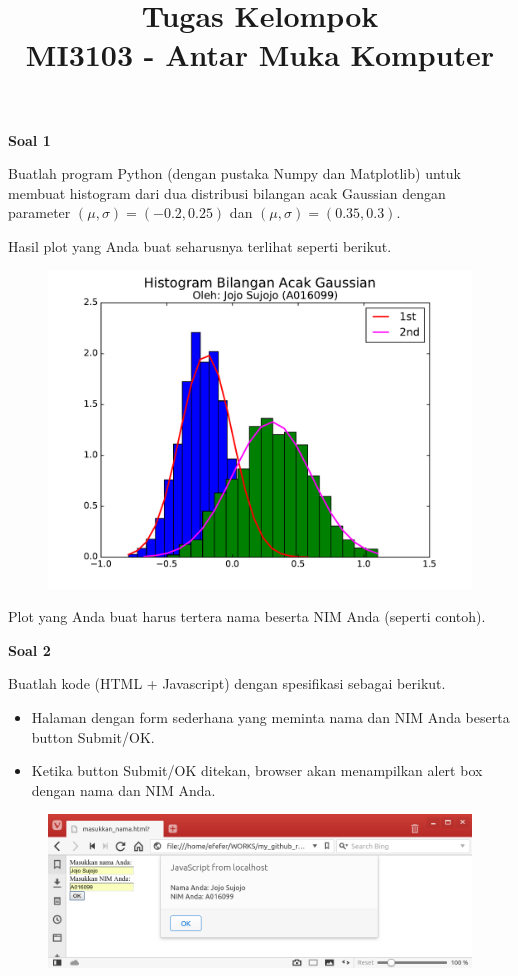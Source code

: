 \documentclass[a4paper,10pt]{extarticle}
\title{
Tugas Kelompok \\
MI3103 - Antar Muka Komputer}
\author{}
\date{}
\begin{document}
\maketitle

\textbf{Soal 1}

Buatlah program Python (dengan pustaka Numpy dan Matplotlib)
untuk membuat histogram dari dua distribusi bilangan
acak Gaussian dengan parameter $(\mu,\sigma) = (-0.2,0.25)$
dan $(\mu,\sigma) = (0.35,0.3)$.

Hasil plot yang Anda buat seharusnya terlihat seperti berikut.

\begin{figure}[h]
{\centering
\includegraphics[scale=0.5]{images/normal_v1.pdf}
\par}
\end{figure}
%
Plot yang Anda buat harus tertera nama beserta NIM Anda (seperti contoh).

\textbf{Soal 2}

Buatlah kode (HTML + Javascript) dengan spesifikasi sebagai berikut.
\begin{itemize}
\item Halaman dengan form sederhana yang meminta nama dan NIM Anda beserta
button Submit/OK.
\item Ketika button Submit/OK ditekan, browser akan menampilkan alert box
dengan nama dan NIM Anda.
\end{itemize}

\begin{figure}[!h]
{\centering
\includegraphics[scale=0.4]{images/JojoSujojo.png}
\par}
\end{figure}
\end{document}
